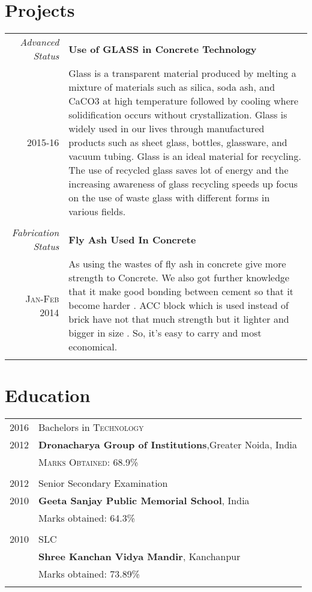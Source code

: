 \documentclass[a4paper,10pt]{article}
\begin{document}
\section{Projects}
\begin{tabular}{r|p{11cm}}

\emph{Advanced Status} & \textbf{Use of GLASS in Concrete Technology}\\ \textsc{2015-16} & \small{Glass is a transparent material produced by melting a mixture of materials such as silica, soda ash, and CaCO3 at high temperature followed by cooling where solidification occurs without crystallization. Glass is widely used in our lives through manufactured products such as sheet glass, bottles, glassware, and vacuum tubing. Glass is an ideal material for recycling. The use of recycled glass saves lot of energy and the increasing awareness of glass recycling speeds up focus on the use of waste glass with different forms in various fields. 
}\\\multicolumn{2}{c}{} \\


\emph{Fabrication Status} & \textbf{Fly Ash Used In Concrete}\\ \textsc{Jan-Feb 2014} & \small{As using the wastes of fly ash in concrete give more strength to Concrete. We also got further knowledge that it make good bonding between cement so that it become harder . ACC block which is used instead of brick have not that much strength but it lighter and bigger in size . So, it’s easy to carry and most economical. 
}\\\multicolumn{2}{c}{} \\

\end{tabular}

\section{Education}
\begin{tabular}{rl}	
2016  & Bachelors in \textsc{Technology}\\
2012 & \textbf{Dronacharya Group of Institutions},Greater Noida, India\\
& \normalsize \textsc{Marks Obtained}: 68.9\% \\\\
2012 & Senior Secondary Examination \\ 
2010 &\normalsize\textbf{Geeta Sanjay Public Memorial School}, India\\
&Marks obtained: 64.3\%\\&\\
2010& SLC\\ & \textbf{Shree Kanchan Vidya Mandir}, Kanchanpur\\
&Marks obtained: 73.89\%\\&\\
\end{tabular}
\end{document}
